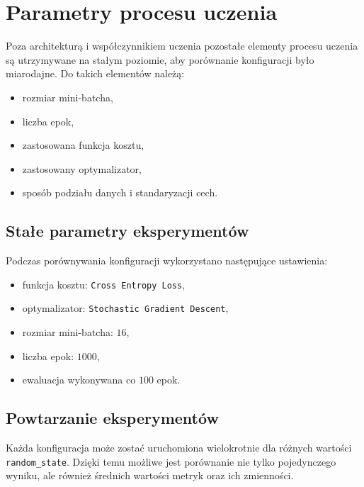 \section{Parametry procesu uczenia}

Poza architekturą i współczynnikiem uczenia pozostałe elementy procesu
uczenia są utrzymywane na stałym poziomie, aby porównanie konfiguracji było
miarodajne. Do takich elementów należą:
\begin{itemize}
    \item rozmiar mini-batcha,
    \item liczba epok,
    \item zastosowana funkcja kosztu,
    \item zastosowany optymalizator,
    \item sposób podziału danych i standaryzacji cech.
\end{itemize}

\subsection{Stałe parametry eksperymentów}

Podczas porównywania konfiguracji wykorzystano następujące ustawienia:
\begin{itemize}
    \item funkcja kosztu: \texttt{Cross Entropy Loss},
    \item optymalizator: \texttt{Stochastic Gradient Descent},
    \item rozmiar mini-batcha: \(16\),
    \item liczba epok: \(1000\),
    \item ewaluacja wykonywana co \(100\) epok.
\end{itemize}

\subsection{Powtarzanie eksperymentów}

Każda konfiguracja może zostać uruchomiona wielokrotnie dla różnych wartości
\texttt{random\_state}. Dzięki temu możliwe jest porównanie nie tylko
pojedynczego wyniku, ale również średnich wartości metryk oraz ich zmienności.
